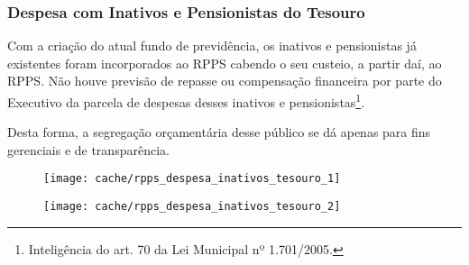 
\subsubsection{Despesa com Inativos e Pensionistas do Tesouro}

Com a criação do atual fundo de previdência, os inativos e pensionistas já existentes foram incorporados ao RPPS cabendo o seu custeio, a partir daí, ao RPPS. Não houve previsão de repasse ou compensação financeira por parte do Executivo da parcela de despesas desses inativos e pensionistas\footnote{Inteligência do art. 70 da Lei Municipal nº 1.701/2005.}.

Desta forma, a segregação orçamentária desse público se dá apenas para fins gerenciais e de transparência.





\begin{figure}[H]
\center
\texttt{[image: cache/rpps\_despesa\_inativos\_tesouro\_1]}
\end{figure}

\begin{figure}[H]
\center
\texttt{[image: cache/rpps\_despesa\_inativos\_tesouro\_2]}
\end{figure}

